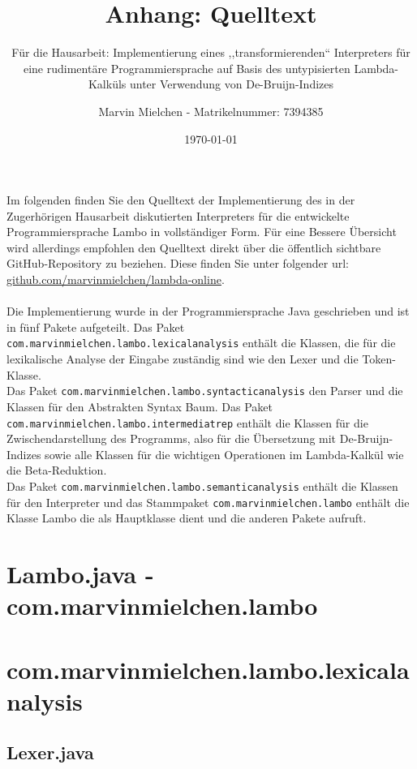 \documentclass[ngerman]{article}
\title{Anhang: Quelltext}
\author{Marvin Mielchen - Matrikelnummer: 7394385}
\subtitle{Für die Hausarbeit: Implementierung eines ,,transformierenden“ Interpreters für eine rudimentäre Programmiersprache auf Basis des untypisierten Lambda-Kalküls unter Verwendung von De-Bruijn-Indizes}
\date{\today}
\begin{document}
\maketitle
Im folgenden finden Sie den Quelltext der Implementierung des in der Zugerhörigen Hausarbeit diskutierten Interpreters für die entwickelte Programmiersprache Lambo in vollständiger Form. Für eine Bessere Übersicht wird allerdings empfohlen den Quelltext direkt über die öffentlich sichtbare GitHub-Repository zu beziehen. Diese finden Sie unter folgender url: \href{https://github.com/marvinmielchen/lambda-online}{github.com/marvinmielchen/lambda-online}.\\\\
Die Implementierung wurde in der Programmiersprache Java geschrieben und ist in fünf Pakete aufgeteilt. 
Das Paket \texttt{com.marvinmielchen.lambo.lexicalanalysis} enthält die Klassen, die für die lexikalische Analyse der Eingabe zuständig sind wie den Lexer und die Token-Klasse. 
\\Das Paket \texttt{com.marvinmielchen.lambo.syntacticanalysis} den Parser und die Klassen für den Abstrakten Syntax Baum. 
Das Paket \texttt{com.marvinmielchen.lambo.intermediatrep} enthält die Klassen für die Zwischendarstellung des Programms, also für die Übersetzung mit De-Bruijn-Indizes sowie alle Klassen für die wichtigen Operationen im Lambda-Kalkül wie die Beta-Reduktion. 
\\Das Paket \texttt{com.marvinmielchen.lambo.semanticanalysis} enthält die Klassen für den Interpreter und das Stammpaket \texttt{com.marvinmielchen.lambo} enthält die Klasse Lambo die als Hauptklasse dient und die anderen Pakete aufruft.

\newpage

\section{Lambo.java - com.marvinmielchen.lambo}


\section{com.marvinmielchen.lambo.lexicalanalysis}

\subsection{Lexer.java}

\end{document}
